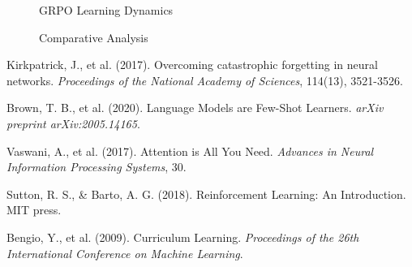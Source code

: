 \documentclass[11pt]{article}
\begin{document}
\begin{figure}[H]
    \centering
    \caption{GRPO Learning Dynamics}
    \label{fig:grpo}
\end{figure}

\begin{figure}[H]
    \centering
    \caption{Comparative Analysis}
    \label{fig:comparison}
\end{figure}


\begin{thebibliography}{5}
 Kirkpatrick, J., et al. (2017). Overcoming catastrophic forgetting in neural networks. \textit{Proceedings of the National Academy of Sciences}, 114(13), 3521-3526.

 Brown, T. B., et al. (2020). Language Models are Few-Shot Learners. \textit{arXiv preprint arXiv:2005.14165}.

 Vaswani, A., et al. (2017). Attention is All You Need. \textit{Advances in Neural Information Processing Systems}, 30.

 Sutton, R. S., \& Barto, A. G. (2018). Reinforcement Learning: An Introduction. MIT press.

 Bengio, Y., et al. (2009). Curriculum Learning. \textit{Proceedings of the 26th International Conference on Machine Learning}.
\end{thebibliography}
\end{document}
